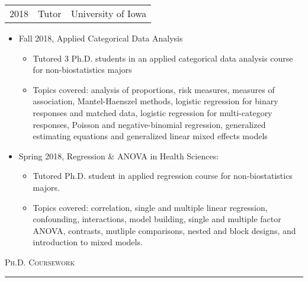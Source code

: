 \documentclass[a4paper]{article}
\begin{document}
\begin{tabular*}{0.95\textwidth}{@{\extracolsep{\fill}}ccc}
  2018 & Tutor & University of Iowa  \\
\end{tabular*}
\begin{itemize}[itemsep = 0.3ex, leftmargin = 1cm]
  \item Fall 2018, Applied Categorical Data Analysis
  \begin{itemize}[itemsep = 0.3ex]
    \item Tutored 3 Ph.D. students in an applied categorical data analysis course for non-biostatistics majors
    \item Topics covered: analysis of proportions, risk measures, measures of association,
      Mantel-Haenszel methods, logistic regression for binary responses and matched data,
      logistic regression for multi-category responses, Poisson and negative-binomial
      regression, generalized estimating equations and generalized linear mixed effects models
  \end{itemize}
  \item Spring 2018, Regression \& ANOVA in Health Sciences:
  \begin{itemize}[itemsep = 0.3ex]
    \item Tutored Ph.D. student in applied regression course for non-biostatistics majors.
    \item Topics covered: correlation, single and multiple linear regression, confounding, interactions, model building,
      single and multiple factor ANOVA, contrasts, mutliple comparisons, nested and block designs, and introduction to
      mixed models.
  \end{itemize}
\end{itemize}
\vspace{0.25\baselineskip}

\begin{flushleft}
  \Large\textsc{Ph.D. Coursework}
  \textcolor{usafagrey}{\rule[0.5\baselineskip]{\textwidth}{0.75pt}}
\end{flushleft}
\vspace{-1.5\baselineskip}
\end{document}

